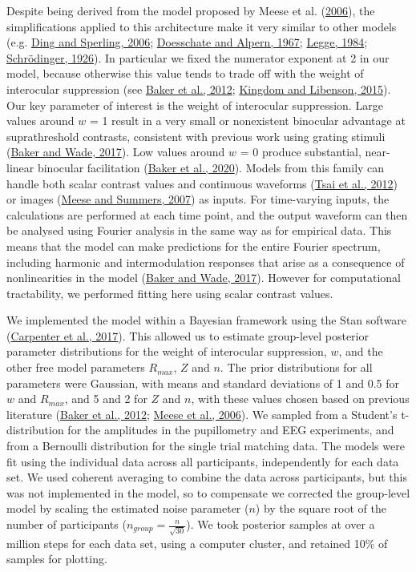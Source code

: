 \documentclass[
]{article}
\begin{document}
Despite being derived from the model proposed by Meese et al. (\protect\hyperlink{ref-Meese2006}{2006}), the simplifications applied to this architecture make it very similar to other models (e.g. \protect\hyperlink{ref-Ding2006}{Ding and Sperling, 2006}; \protect\hyperlink{ref-Doesschate1967}{Doesschate and Alpern, 1967}; \protect\hyperlink{ref-Legge1984}{Legge, 1984}; \protect\hyperlink{ref-Schrodinger1926}{Schrödinger, 1926}). In particular we fixed the numerator exponent at 2 in our model, because otherwise this value tends to trade off with the weight of interocular suppression (see \protect\hyperlink{ref-Baker2012}{Baker et al., 2012}; \protect\hyperlink{ref-Kingdom2015}{Kingdom and Libenson, 2015}). Our key parameter of interest is the weight of interocular suppression. Large values around \(w\) = 1 result in a very small or nonexistent binocular advantage at suprathreshold contrasts, consistent with previous work using grating stimuli (\protect\hyperlink{ref-Baker2017}{Baker and Wade, 2017}). Low values around \(w\) = 0 produce substantial, near-linear binocular facilitation (\protect\hyperlink{ref-Baker2020}{Baker et al., 2020}). Models from this family can handle both scalar contrast values and continuous waveforms (\protect\hyperlink{ref-Tsai2012}{Tsai et al., 2012}) or images (\protect\hyperlink{ref-Meese2007}{Meese and Summers, 2007}) as inputs. For time-varying inputs, the calculations are performed at each time point, and the output waveform can then be analysed using Fourier analysis in the same way as for empirical data. This means that the model can make predictions for the entire Fourier spectrum, including harmonic and intermodulation responses that arise as a consequence of nonlinearities in the model (\protect\hyperlink{ref-Baker2017}{Baker and Wade, 2017}). However for computational tractability, we performed fitting here using scalar contrast values.

We implemented the model within a Bayesian framework using the Stan software (\protect\hyperlink{ref-Carpenter2017}{Carpenter et al., 2017}). This allowed us to estimate group-level posterior parameter distributions for the weight of interocular suppression, \(w\), and the other free model parameters \(R_{max}\), \(Z\) and \(n\). The prior distributions for all parameters were Gaussian, with means and standard deviations of 1 and 0.5 for \(w\) and \(R_{max}\), and 5 and 2 for \(Z\) and \(n\), with these values chosen based on previous literature (\protect\hyperlink{ref-Baker2012}{Baker et al., 2012}; \protect\hyperlink{ref-Meese2006}{Meese et al., 2006}). We sampled from a Student's t-distribution for the amplitudes in the pupillometry and EEG experiments, and from a Bernoulli distribution for the single trial matching data. The models were fit using the individual data across all participants, independently for each data set. We used coherent averaging to combine the data across participants, but this was not implemented in the model, so to compensate we corrected the group-level model by scaling the estimated noise parameter (\(n\)) by the square root of the number of participants (\(n_{group} = \frac{n}{\sqrt{30}}\)). We took posterior samples at over a million steps for each data set, using a computer cluster, and retained 10\% of samples for plotting.
\end{document}
